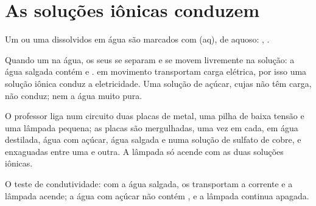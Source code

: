 \section{As soluções iônicas conduzem}

\begin{notation}\label{not:g9:ions:aq}
Um  ou uma  dissolvidos em água são marcados com (aq), de
aquoso: , .
\end{notation}

\begin{proposition}\label{prop:g9:ions:conduct}
Quando um   na água, os seus  se separam e
se movem livremente na solução: a água salgada contém  e
.  em movimento transportam carga elétrica, por isso uma
solução iônica conduz a eletricidade. Uma solução de açúcar, cujas
 não têm carga, não conduz; nem a água muito pura.
\end{proposition}

\begin{inthelab}
O professor liga num circuito duas placas de metal, uma pilha de baixa
tensão e uma lâmpada pequena; as placas são mergulhadas, uma vez em
cada, em água destilada, água com açúcar, água salgada e numa solução de
sulfato de cobre, e enxaguadas entre uma e outra. A lâmpada só acende
com as duas soluções iônicas.
\end{inthelab}

\begin{omfigure}

{\small O teste de condutividade: com a água salgada, os 
transportam a corrente e a lâmpada acende; a água com açúcar não contém
, e a lâmpada continua apagada.}
\end{omfigure}

